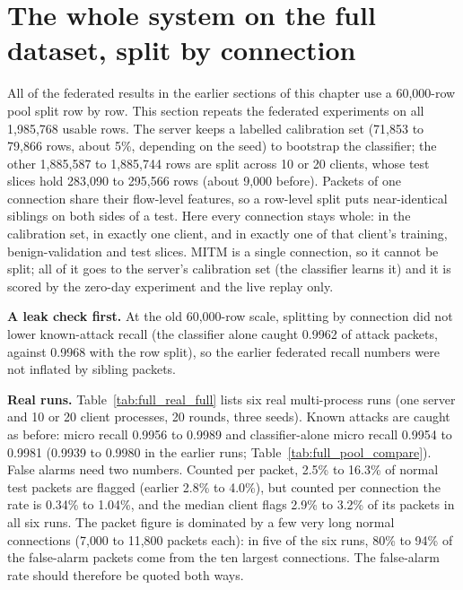 \section{The whole system on the full dataset, split by connection}\label{sec:fullpool}
All of the federated results in the earlier sections of this chapter use a 60{,}000-row pool split row by row. This section repeats the federated experiments on all 1{,}985{,}768 usable rows. The server keeps a labelled calibration set (71{,}853 to 79{,}866 rows, about 5\%, depending on the seed) to bootstrap the classifier; the other 1{,}885{,}587 to 1{,}885{,}744 rows are split across 10 or 20 clients, whose test slices hold 283{,}090 to 295{,}566 rows (about 9{,}000 before). Packets of one connection share their flow-level features, so a row-level split puts near-identical siblings on both sides of a test. Here every connection stays whole: in the calibration set, in exactly one client, and in exactly one of that client's training, benign-validation and test slices. MITM is a single connection, so it cannot be split; all of it goes to the server's calibration set (the classifier learns it) and it is scored by the zero-day experiment and the live replay only.

\textbf{A leak check first.} At the old 60{,}000-row scale, splitting by connection did not lower known-attack recall (the classifier alone caught 0.9962 of attack packets, against 0.9968 with the row split), so the earlier federated recall numbers were not inflated by sibling packets.

\textbf{Real runs.} Table~\ref{tab:full_real_full} lists six real multi-process runs (one server and 10 or 20 client processes, 20 rounds, three seeds). Known attacks are caught as before: micro recall 0.9956 to 0.9989 and classifier-alone micro recall 0.9954 to 0.9981 (0.9939 to 0.9980 in the earlier runs; Table~\ref{tab:full_pool_compare}). False alarms need two numbers. Counted per packet, 2.5\% to 16.3\% of normal test packets are flagged (earlier 2.8\% to 4.0\%), but counted per connection the rate is 0.34\% to 1.04\%, and the median client flags 2.9\% to 3.2\% of its packets in all six runs. The packet figure is dominated by a few very long normal connections (7{,}000 to 11{,}800 packets each): in five of the six runs, 80\% to 94\% of the false-alarm packets come from the ten largest connections. The false-alarm rate should therefore be quoted both ways.

